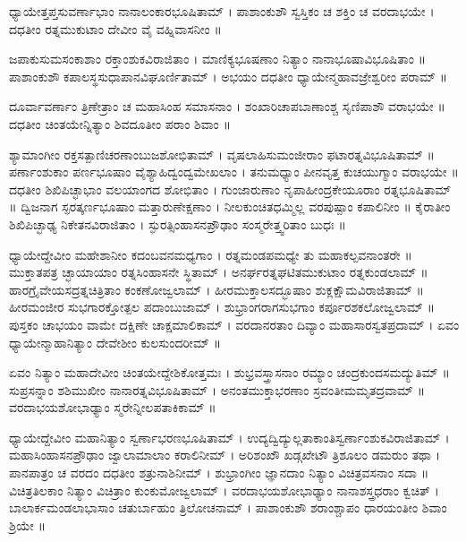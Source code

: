 ಧ್ಯಾಯೇತ್ತಪ್ತಸುವರ್ಣಾಭಾಂ ನಾನಾಲಂಕಾರಭೂಷಿತಾಮ್ ।
ಪಾಶಾಂಕುಶೌ ಸ್ವಸ್ತಿಕಂ ಚ ಶಕ್ತಿಂ ಚ ವರದಾಭಯೇ ।
ದಧತೀಂ ರತ್ನಮುಕುಟಾಂ ದೇವೀಂ ವೈ ವಹ್ನಿವಾಸನೀಂ ॥

ಜಪಾಕುಸುಮಸಂಕಾಶಾಂ ರಕ್ತಾಂಶುಕವಿರಾಜಿತಾಂ ।
ಮಾಣಿಕ್ಯಭೂಷಣಾಂ ನಿತ್ಯಾಂ ನಾನಾಭೂಷಾವಿಭೂಷಿತಾಂ ॥
ಪಾಶಾಂಕುಶೌ ಕಪಾಲಸ್ಥಸುಧಾಪಾನವಿಘೂರ್ಣಿತಾಮ್ ।
ಅಭಯಂ ದಧತೀಂ ಧ್ಯಾಯೇನ್ಮಹಾವಜ್ರೇಶ್ವರೀಂ ಪರಾಮ್ ॥

ದೂರ್ವಾವರ್ಣಾಂ ತ್ರಿಣೇತ್ರಾಂ ಚ ಮಹಾಸಿಂಹ ಸಮಾಸನಾಂ ।
ಶಂಖಾರಿಚಾಪಬಾಣಾಂಶ್ಚ ಸೃಣಿಪಾಶೌ ವರಾಭಯೇ ॥
ದಧತೀಂ ಚಿಂತಯೇನ್ನಿತ್ಯಾಂ ಶಿವದೂತೀಂ ಪರಾಂ ಶಿವಾಂ ॥

ಶ್ಯಾಮಾಂಗೀಂ ರಕ್ತಸತ್ಪಾಣಿಚರಣಾಂಬುಜಶೋಭಿತಾಮ್ ।
ವೃಷಲಾಹಿಸುಮಂಜೀರಾಂ ಫಟಾರತ್ನವಿಭೂಷಿತಾಮ್ ॥
ಪರ್ಣಾಂಶುಕಾಂ ಪರ್ಣಭೂಷಾಂ ವೈಶ್ಯಾಹಿದ್ವಂದ್ವಮೇಖಲಾಂ ।
ತನುಮಧ್ಯಾಂ ಪೀನವೃತ್ತ ಕುಚಯುಗ್ಮಾಂ ವರಾಭಯೇ ॥
ದಧತೀಂ ಶಿಖಿಪಿಚ್ಛಾಭಾಂ ವಲಯಾಂಗದ ಶೋಭಿತಾಂ ।
ಗುಂಜಾರುಣಾಂ ನೃಪಾಹೀಂದ್ರಕೇಯೂರಾಂ ರತ್ನಭೂಷಿತಾಮ್ ॥
ದ್ವಿಜನಾಗ ಸ್ಫರತ್ಕರ್ಣಭೂಷಾಂ ಮತ್ತಾರುಣೇಕ್ಷಣಾಂ ।
ನೀಲಕುಂಚಿತಧಮ್ಮಿಲ್ಲ ವರಪುಷ್ಪಾಂ ಕಪಾಲಿನೀಂ ॥
ಕೈರಾತೀಂ ಶಿಖಿಪಿಚ್ಛಾಢ್ಯ ನಿಕೇತನವಿರಾಜಿತಾಂ ।
ಸ್ಫುರತ್ಸಿಂಹಾಸನಪ್ರೌಢಾಂ ಸಂಸ್ಮರೇತ್ತ್ವರಿತಾಂ ಬುಧಃ ॥

ಧ್ಯಾಯೇದ್ದೇವೀಂ ಮಹೇಶಾನೀಂ ಕದಂಬವನಮಧ್ಯಗಾಂ ।
ರತ್ನಮಂಡಪಮಧ್ಯೇ ತು ಮಹಾಕಲ್ಪವನಾಂತರೇ ॥
ಮುಕ್ತಾತಪತ್ರ ಚ್ಛಾಯಾಯಾಂ ರತ್ನಸಿಂಹಾಸನೇ ಸ್ಥಿತಾಮ್ ।
ಅನರ್ಘರತ್ನಘಟಿತಮುಕುಟಾಂ ರತ್ನಕುಂಡಲಾಮ್ ॥
ಹಾರಗ್ರೈವೇಯಸದ್ರತ್ನಚಿತ್ರಿತಾಂ ಕಂಕಣೋಜ್ವಲಾಮ್ ।
ಹೀರಮುಕ್ತಾಲಸದ್ಭೂಷಾಂ ಶುಕ್ಲಕ್ಷೌಮವಿರಾಜಿತಾಮ್ ॥
ಹೀರಮಂಜೀರ ಸುಭಗಾರಕ್ತೋತ್ಪಲ ಪದಾಂಬುಜಾಮ್ ।
ಶುಭ್ರಾಂಗರಾಗಸುಭಗಾಂ ಕರ್ಪೂರಶಕಲೋಜ್ವಲಾಮ್ ॥
ಪುಸ್ತಕಂ ಚಾಭಯಂ ವಾಮೇ ದಕ್ಷಿಣೇ ಚಾಕ್ಷಮಾಲಿಕಾಮ್ ।
ವರದಾನರತಾಂ ದಿವ್ಯಾಂ ಮಹಾಸಾರಸ್ವತಪ್ರದಾಮ್ ।
ಏವಂ ಧ್ಯಾಯೇನ್ಮಾಹಾನಿತ್ಯಾಂ ದೇವೇಶೀಂ ಕುಲಸುಂದರೀಮ್ ॥

ಏವಂ ನಿತ್ಯಾಂ ಮಹಾದೇವೀಂ ಚಿಂತಯೇದ್ದೇಶಿಕೋತ್ತಮಃ ।
ಶುಭ್ರವಸ್ತ್ರಾಸನಾಂ ರಮ್ಯಾಂ ಚಂದ್ರಕುಂದಸಮದ್ಯುತಿಮ್ ॥
ಸುಪ್ರಸನ್ನಾಂ ಶಶಿಮುಖೀಂ ನಾನಾರತ್ನವಿಭೂಷಿತಾಮ್ ।
ಅನಂತಮುಕ್ತಾಭರಣಾಂ ಸ್ರವಂತೀಮಮೃತದ್ರವಾಮ್ ॥
ವರದಾಭಯಶೋಭಾಢ್ಯಾಂ ಸ್ಮರೇನ್ನೀಲಪತಾಕಿಕಾಮ್ ॥

ಧ್ಯಾಯೇದ್ದೇವೀಂ ಮಹಾನಿತ್ಯಾಂ ಸ್ವರ್ಣಾಭರಣಭೂಷಿತಾಮ್ ।
ಉದ್ಯದ್ವಿದ್ಯುಲ್ಲತಾಕಾಂತಿಸ್ವರ್ಣಾಂಶುಕವಿರಾಜಿತಾಮ್ । ಮಹಾಸಿಂಹಾಸನಪ್ರೌಢಾಂ ಜ್ವಾಲಾಮಾಲಾಂ ಕರಾಲಿನೀಮ್ ।
ಅರಿಶಂಖೌ ಖಡ್ಗಖೇಟೌ ತ್ರಿಶೂಲಂ ಡಮರುಂ ತಥಾ । ಪಾನಪಾತ್ರಂ ಚ ವರದಂ ದಧತೀಂ ಶತ್ರುನಾಶಿನೀಮ್ ।
ಶುಭ್ರಾಂಗೀಂ ಜ್ಞಾನದಾಂ ನಿತ್ಯಾಂ ವಿಚಿತ್ರವಸನಾಂ ಸದಾ ॥ವಿಚಿತ್ರತಿಲಕಾಂ ನಿತ್ಯಾಂ ವಿಚಿತ್ರಾಂ ಕುಂಕುಮೋಜ್ವಲಾಮ್ ।
ವರದಾಭಯಶೋಭಾಢ್ಯಾಂ ನಾನಾಶಸ್ತ್ರಧರಾಂ ಕ್ವಚಿತ್ ।ಬಾಲಾರ್ಕಮಂಡಲಾಭಾಸಾಂ ಚತುರ್ಬಾಹುಂ ತ್ರಿಲೋಚನಾಮ್ ।
ಪಾಶಾಂಕುಶೌ ಶರಾಂಶ್ಚಾಪಂ ಧಾರಯಂತೀಂ ಶಿವಾಂ ಶ್ರಿಯೇ ॥
